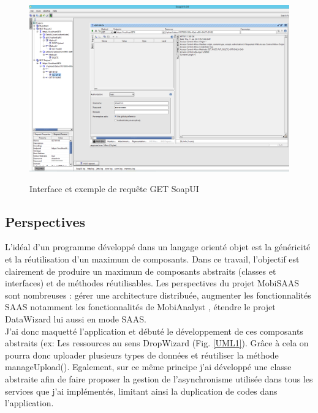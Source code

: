 \begin{itemize}
\begin{center}
\begin{figure}[h] \centering
\includegraphics[width=16cm]{images/soapUI_getById_sansResponse_small.png}\\
\caption{\label{SoapUIGet} Interface et exemple de requête \og GET \fg SoapUI}
\end{figure}
\end{center}


\subsection{Perspectives}

L'idéal d'un programme développé dans un langage orienté objet est la généricité et la réutilisation d'un maximum de composants. Dans ce travail, l'objectif est clairement de produire un maximum de composants abstraits (classes et interfaces) et de méthodes réutilisables. 
Les perspectives du projet \og MobiSAAS \fg sont nombreuses : gérer une architecture distribuée, augmenter les fonctionnalités SAAS notamment les fonctionnalités de \og MobiAnalyst \fg, étendre le projet \og DataWizard \fg lui aussi en mode SAAS.\\

J'ai donc \og maquetté l'application \fg et débuté le développement de ces composants abstraits (ex: Les ressources au sens DropWizard (Fig. \ref{UML1}). Grâce à cela on pourra donc \og uploader \fg plusieurs types de données et réutiliser la méthode manageUpload(). Egalement, sur ce même principe j'ai développé une classe abstraite afin de faire proposer la gestion de l'asynchronisme utilisée dans tous les services que j'ai implémentés, limitant ainsi la duplication de codes dans l'application.\\


\end{itemize}
